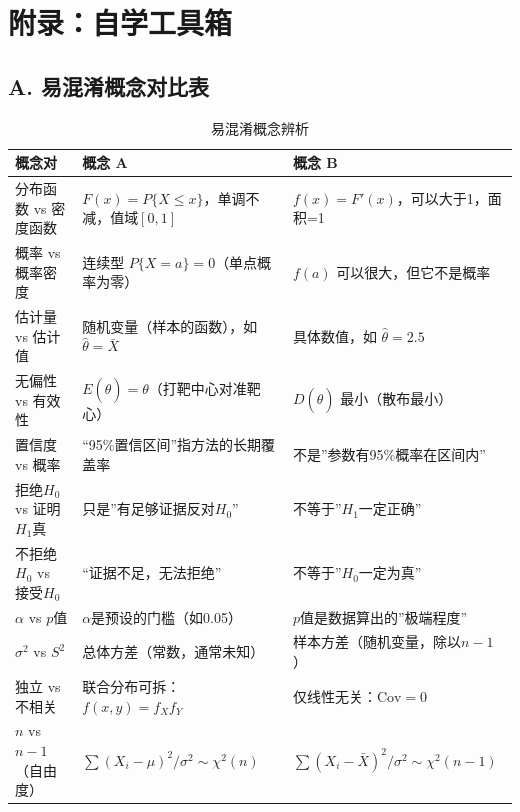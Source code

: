 ﻿\documentclass[lang=cn,11pt]{elegantbook}
\begin{document}

\chapter*{附录：自学工具箱}

\section*{A. 易混淆概念对比表}

\begin{table}[htbp]
\centering
\caption{易混淆概念辨析}
\label{tab:confusion_pairs}
\begin{tabular}{p{3.5cm}p{5.5cm}p{5.5cm}}
\toprule
\textbf{概念对} & \textbf{概念 A} & \textbf{概念 B} \\
\midrule
分布函数 vs 密度函数 & $F(x)=P\{X\leq x\}$，单调不减，值域$[0,1]$ & $f(x)=F'(x)$，可以大于1，面积=1 \\
\midrule
概率 vs 概率密度 & 连续型 $P\{X=a\}=0$（单点概率为零） & $f(a)$ 可以很大，但它不是概率 \\
\midrule
估计量 vs 估计值 & 随机变量（样本的函数），如 $\hat\theta=\bar X$ & 具体数值，如 $\hat\theta=2.5$ \\
\midrule
无偏性 vs 有效性 & $E(\hat\theta)=\theta$（打靶中心对准靶心） & $D(\hat\theta)$ 最小（散布最小） \\
\midrule
置信度 vs 概率 & “95\%置信区间”指方法的长期覆盖率 & 不是”参数有95\%概率在区间内” \\
\midrule
拒绝$H_0$ vs 证明$H_1$真 & 只是”有足够证据反对$H_0$” & 不等于”$H_1$一定正确” \\
\midrule
不拒绝$H_0$ vs 接受$H_0$ & “证据不足，无法拒绝” & 不等于”$H_0$一定为真” \\
\midrule
$\alpha$ vs $p$值 & $\alpha$是预设的门槛（如0.05） & $p$值是数据算出的”极端程度” \\
\midrule
$\sigma^2$ vs $S^2$ & 总体方差（常数，通常未知） & 样本方差（随机变量，除以$n-1$） \\
\midrule
独立 vs 不相关 & 联合分布可拆：$f(x,y)=f_X f_Y$ & 仅线性无关：$\mathrm{Cov}=0$ \\
\midrule
$n$ vs $n-1$（自由度） & $\sum(X_i-\mu)^2/\sigma^2\sim\chi^2(n)$ & $\sum(X_i-\bar X)^2/\sigma^2\sim\chi^2(n-1)$ \\
\bottomrule
\end{tabular}
\end{table}
\end{document}
